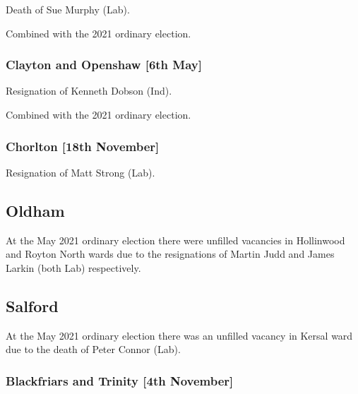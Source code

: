 \documentclass[a4paper,openany]{book}
\begin{document}
\begin{resultsiii}

Death of Sue Murphy (Lab).

Combined with the 2021 ordinary election.

\subsubsection*{Clayton and Openshaw \hspace*{\fill}\nolinebreak[1]%
	\enspace\hspace*{\fill}
	[6th May]}


Resignation of Kenneth Dobson (Ind).

Combined with the 2021 ordinary election.

\subsubsection*{Chorlton \hspace*{\fill}\nolinebreak[1]%
	\enspace\hspace*{\fill}
	[18th November]}


Resignation of Matt Strong (Lab).

\subsection*{Oldham}

At the May 2021 ordinary election there were unfilled vacancies in Hollinwood and Royton North wards due to the resignations of Martin Judd and James Larkin (both Lab) respectively.

\subsection*{Salford}

At the May 2021 ordinary election there was an unfilled vacancy in Kersal ward due to the death of Peter Connor (Lab).

\subsubsection*{Blackfriars and Trinity \hspace*{\fill}\nolinebreak[1]%
	\enspace\hspace*{\fill}
	[4th November]}


\end{resultsiii}
\end{document}
